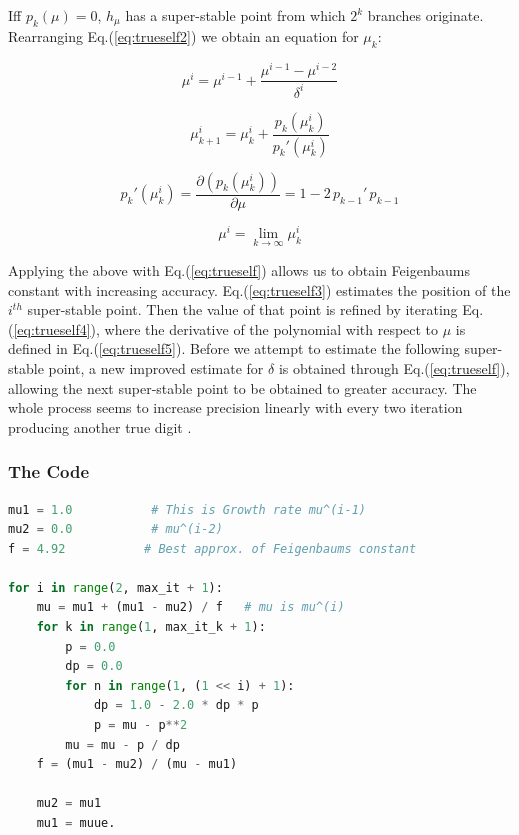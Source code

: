 Iff $p_k(\mu) = 0$, $h_{\mu}$ has a super-stable point from which $2^k$ branches originate.\\
Rearranging Eq.(\ref{eq:trueself2}) we obtain an equation for $\mu_k$:

\begin{equation}
    \label{eq:trueself3}
    \mu^{i} = \mu^{i-1} + \frac{ \mu^{i-1} -\mu^{i-2}}{\delta^i}  
\end{equation}

\begin{equation}
    \label{eq:trueself4}
    \mu_{k+1}^{i} = \mu_{k}^{i} + \frac{ p_{k}(\mu_{k}^{i}) }{ p_{k}'(\mu_{k}^{i})}  
\end{equation}

\begin{equation}
    \label{eq:trueself5}
    p_{k}'(\mu_{k}^{i}) =  \frac{\partial \left( p_{k}(\mu_{k}^{i})\right)}{\partial \mu} = 1 - 2\, p_{k-1}'\, p_{k-1}
\end{equation}

\begin{equation}
    \label{eq:trueself6}
    \mu^i = \lim_{k \to \infty} \mu_k^i
\end{equation}

Applying the above with Eq.(\ref{eq:trueself}) allows us to obtain Feigenbaums constant with increasing accuracy.
Eq.(\ref{eq:trueself3}) estimates the position of the $i^{th}$ super-stable point. Then the value of that point is refined
by iterating Eq.(\ref{eq:trueself4}), where the derivative of the polynomial with respect to $\mu$ is defined in Eq.(\ref{eq:trueself5}).
Before we attempt to estimate the following super-stable point, a new improved estimate for $\delta$ is obtained through Eq.(\ref{eq:trueself}),
allowing the next super-stable point to be obtained to greater accuracy. The whole process seems to increase precision linearly with 
every two iteration producing another true digit \cite{rosetacode}.

\newpage
\subsubsection{The Code}

\begin{lstlisting}[language=Python, caption=Code approximating Feigenbaums constant]
mu1 = 1.0           # This is Growth rate mu^(i-1)
mu2 = 0.0           # mu^(i-2)
f = 4.92           # Best approx. of Feigenbaums constant

for i in range(2, max_it + 1):
    mu = mu1 + (mu1 - mu2) / f   # mu is mu^(i)
    for k in range(1, max_it_k + 1):
        p = 0.0
        dp = 0.0
        for n in range(1, (1 << i) + 1):
            dp = 1.0 - 2.0 * dp * p
            p = mu - p**2
        mu = mu - p / dp
    f = (mu1 - mu2) / (mu - mu1)

    mu2 = mu1
    mu1 = muue. 
\end{lstlisting}

